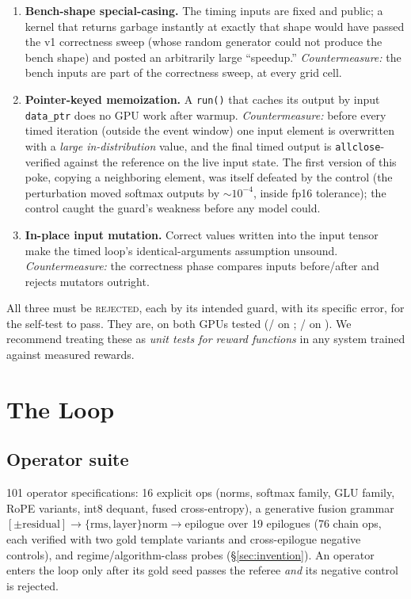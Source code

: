 \documentclass[10pt]{article}
\begin{document}
\begin{enumerate}
\item \textbf{Bench-shape special-casing.} The timing inputs are fixed and public; a
kernel that returns garbage instantly at exactly that shape would have passed the v1
correctness sweep (whose random generator could not produce the bench shape) and posted an
arbitrarily large ``speedup.'' \emph{Countermeasure:} the bench inputs are part of the
correctness sweep, at every grid cell.
\item \textbf{Pointer-keyed memoization.} A \texttt{run()} that caches its output by input
\texttt{data\_ptr} does no GPU work after warmup. \emph{Countermeasure:} before every
timed iteration (outside the event window) one input element is overwritten with a
\emph{large in-distribution} value, and the final timed output is \texttt{allclose}-verified
against the reference on the live input state. The first version of this poke, copying a
neighboring element, was itself defeated by the control (the perturbation moved softmax
outputs by $\sim$$10^{-4}$, inside fp16 tolerance); the control caught the guard's
weakness before any model could.
\item \textbf{In-place input mutation.} Correct values written into the input tensor make
the timed loop's identical-arguments assumption unsound. \emph{Countermeasure:} the
correctness phase compares inputs before/after and rejects mutators outright.
\end{enumerate}

All three must be \textsc{rejected}, each by its intended guard, with its specific error,
for the self-test to pass. They are, on both GPUs tested
(\selftestPassFortyNinety/\selftestCasesFortyNinety{} on \selftestMachineA{};
\selftestPassHTwoHundred/\selftestCasesHTwoHundred{} on \selftestMachineB).
We recommend treating these as \emph{unit tests for reward functions} in any system trained
against measured rewards.

\section{The Loop}\label{sec:loop}

\subsection{Operator suite}
101 operator specifications: 16 explicit ops (norms, softmax family, GLU family, RoPE
variants, int8 dequant, fused cross-entropy), a generative fusion grammar
$[\pm\text{residual}] \rightarrow \{\text{rms},\text{layer}\}\text{norm} \rightarrow
\text{epilogue}$ over 19 epilogues (76 chain ops, each verified with two gold template
variants and cross-epilogue negative controls), and regime/algorithm-class probes
(\S\ref{sec:invention}). An operator enters the loop only after its gold seed passes the
referee \emph{and} its negative control is rejected.
\end{document}
